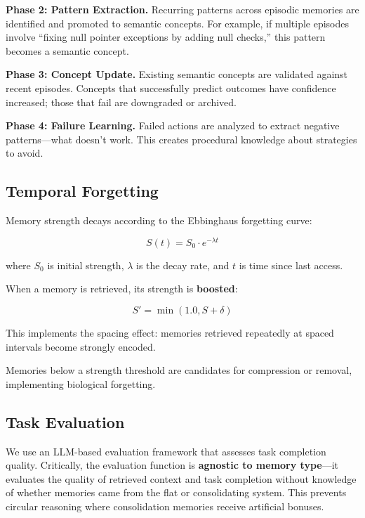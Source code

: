 \documentclass[11pt]{article}
\begin{document}
\textbf{Phase 2: Pattern Extraction.}
Recurring patterns across episodic memories are identified and promoted to semantic concepts. For example, if multiple episodes involve ``fixing null pointer exceptions by adding null checks,'' this pattern becomes a semantic concept.

\textbf{Phase 3: Concept Update.}
Existing semantic concepts are validated against recent episodes. Concepts that successfully predict outcomes have confidence increased; those that fail are downgraded or archived.

\textbf{Phase 4: Failure Learning.}
Failed actions are analyzed to extract negative patterns---what doesn't work. This creates procedural knowledge about strategies to avoid.

\subsection{Temporal Forgetting}

Memory strength decays according to the Ebbinghaus forgetting curve:

\begin{equation}
    S(t) = S_0 \cdot e^{-\lambda t}
\end{equation}

where $S_0$ is initial strength, $\lambda$ is the decay rate, and $t$ is time since last access.

When a memory is retrieved, its strength is \textbf{boosted}:

\begin{equation}
    S' = \min(1.0, S + \delta)
\end{equation}

This implements the spacing effect: memories retrieved repeatedly at spaced intervals become strongly encoded.

Memories below a strength threshold are candidates for compression or removal, implementing biological forgetting.

\subsection{Task Evaluation}

We use an LLM-based evaluation framework that assesses task completion quality. Critically, the evaluation function is \textbf{agnostic to memory type}---it evaluates the quality of retrieved context and task completion without knowledge of whether memories came from the flat or consolidating system. This prevents circular reasoning where consolidation memories receive artificial bonuses.
\end{document}
